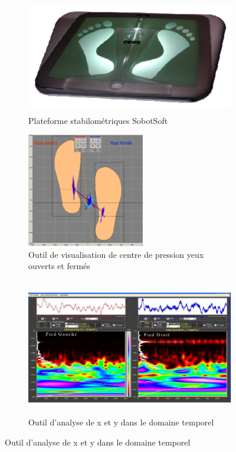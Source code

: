 \begin{figure}[H]
    \centering
    \begin{subfigure}[b]{0.45\textwidth}
      \centering
        \includegraphics[height=5cm]{images/analyse_marche/SabotSoft1.png}
        \caption{Plateforme stabilométriques SobotSoft}\label{fig:sabotsoft1}
    \end{subfigure}
    \begin{subfigure}[b]{0.5\textwidth}
        \centering
        \includegraphics[height=5cm]{images/analyse_marche/SabotSoft2.png}
        \caption{Outil de visualisation de centre de pression yeux ouverts et fermés}\label{fig:SabotSoft23}
    \end{subfigure}
    \begin{subfigure}[b]{0.5\textwidth}
        \centering  
        \includegraphics[height=6cm]{images/analyse_marche/SabotSoft5.png}
        \caption{Outil d'analyse de x et y dans le domaine temporel}\label{fig:SabotSoft5}
    \end{subfigure}
\end{figure}
